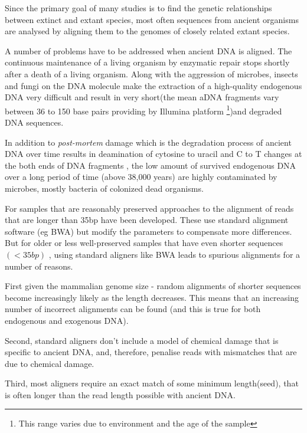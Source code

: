 \documentclass[11pt,a4paper]{report}
\begin{document}
Since the primary goal of many studies is to find the genetic 
relationships between extinct and extant species, most often sequences 
from ancient organisms are analysed by aligning them to the genomes of 
closely related extant species\cite{Neanthertal}\cite{AncientDNA}.

A number of problems have to be addressed when ancient DNA is aligned.
The continuous maintenance of a living organism by enzymatic repair stops 
shortly after a death of a living organism. Along with the aggression of
microbes, insects and fungi on the DNA molecule make the extraction of a 
high-quality endogenous DNA very difficult and result in very short(the 
mean aDNA fragments vary between 36 to 150 base pairs providing by Illumina 
platform\cite{rizzi2012ancient} \footnote{This range varies due to environment 
and the age of the sample})and degraded DNA sequences\cite{paabo2004genetic}.
 
In addition to \emph{post-mortem} damage which is the degradation process of
ancient DNA over time results in deamination of cytosine to uracil and C to T 
changes at the both ends of DNA fragments \cite{futureofaDNA}, the low amount 
of survived endogenous DNA over a long period of time (above 38,000 years) 
are highly contaminated \cite{paabo2004genetic}\cite{aDNA}
by microbes, mostly bacteria of colonized dead organisms.

For samples that are reasonably preserved approaches to the alignment
of reads that are longer than 35bp have been developed. 
These use standard alignment software (eg BWA) but modify the parameters 
to compensate more differences.
But for older or less well-preserved samples that have even shorter 
sequences $(<35 bp)$ \cite{meyer2014mitochondrial},
using standard aligners like BWA leads to spurious alignments for a 
number of reasons.

First given the mammalian genome size - random alignments of shorter 
sequences become increasingly likely as the length decreases. 
This means that an increasing number of incorrect alignments can be 
found (and this is true for both endogenous and exogenous DNA).

Second, standard aligners don't include a model of chemical damage that 
is specific to ancient DNA, and, therefore, penalise reads with mismatches
that are due to chemical damage.

Third, most aligners require an exact match of some minimum length(seed), 
that is often longer than the read length possible with ancient DNA.
\end{document}
